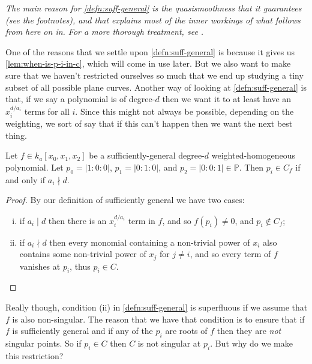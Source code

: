\documentclass[10pt,notitlepage]{article}
\numberwithin{equation}{subsection}
\newcommand{\pee}{\mathbb{P}}
\newcommand{\kathree}{k_a[x_0,x_1,x_2]}
\begin{document}
            \emph{The main reason for \cref{defn:suff-general} is the \emph{quasismoothness} that it guarantees (see the footnotes), and that explains most of the inner workings of what follows from here on in.
            For a more thorough treatment, see \cite[Section~8]{IanoFletcher:2015wc}.}

            One of the reasons that we settle upon \cref{defn:suff-general} is because it gives us \cref{lem:when-is-p-i-in-c}, which will come in use later.
            But we also want to make sure that we haven't restricted ourselves so much that we end up studying a tiny subset of all possible plane curves.
            Another way of looking at \cref{defn:suff-general} is that, if we say a polynomial is of degree-$d$ then we want it to at least have an $x_i^{d/a_i}$ terms for all $i$.
            Since this might not always be possible, depending on the weighting, we sort of say that if this can't happen then we want the next best thing.
            \begin{lemma}\label{lem:when-is-p-i-in-c}
                Let $f\in\kathree$ be a sufficiently-general degree-$d$ weighted-homogeneous polynomial.
                Let $p_0=|1:0:0|$, $p_1=|0:1:0|$, and $p_2=|0:0:1|\in\pee$.
                Then $p_i\in C_f$ if and only if $a_i\nmid d$.
            \end{lemma}

            \begin{proof}
                By our definition of sufficiently general we have two cases:
                \begin{enumerate}[(i)]
                    \item if $a_i\mid d$ then there is an $x_i^{d/a_i}$ term in $f$, and so $f(p_i)\neq0$, and $p_i\not\in C_f$;
                    \item if $a_i\nmid d$ then every monomial containing a non-trivial power of $x_i$ also contains some non-trivial power of $x_j$ for $j\neq i$, and so every term of $f$ vanishes at $p_i$, thus $p_i\in C$.\qedhere
                \end{enumerate}
            \end{proof}

            Really though, condition (ii) in \cref{defn:suff-general} is superfluous if we assume that $f$ is also non-singular.
            The reason that we have that condition is to ensure that if $f$ is sufficiently general and if any of the $p_i$ are roots of $f$ then they are \emph{not} singular points.
            So if $p_i\in C$ then $C$ is not singular at $p_i$.
            But why do we make this restriction?
\end{document}
